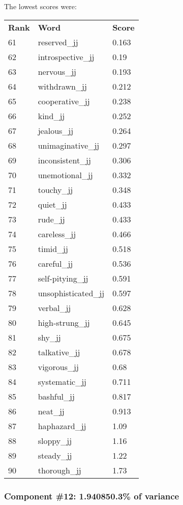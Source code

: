\documentclass[10pt,letterpaper]{book}
\begin{document}
The lowest scores were:
\begin{tabular}{ l l l }
        \textbf{Rank} & \textbf{Word} & \textbf{Score} \\
        61 & reserved\_jj & 0.163 \\
        62 & introspective\_jj & 0.19 \\
        63 & nervous\_jj & 0.193 \\
        64 & withdrawn\_jj & 0.212 \\
        65 & cooperative\_jj & 0.238 \\
        66 & kind\_jj & 0.252 \\
        67 & jealous\_jj & 0.264 \\
        68 & unimaginative\_jj & 0.297 \\
        69 & inconsistent\_jj & 0.306 \\
        70 & unemotional\_jj & 0.332 \\
        71 & touchy\_jj & 0.348 \\
        72 & quiet\_jj & 0.433 \\
        73 & rude\_jj & 0.433 \\
        74 & careless\_jj & 0.466 \\
        75 & timid\_jj & 0.518 \\
        76 & careful\_jj & 0.536 \\
        77 & self-pitying\_jj & 0.591 \\
        78 & unsophisticated\_jj & 0.597 \\
        79 & verbal\_jj & 0.628 \\
        80 & high-strung\_jj & 0.645 \\
        81 & shy\_jj & 0.675 \\
        82 & talkative\_jj & 0.678 \\
        83 & vigorous\_jj & 0.68 \\
        84 & systematic\_jj & 0.711 \\
        85 & bashful\_jj & 0.817 \\
        86 & neat\_jj & 0.913 \\
        87 & haphazard\_jj & 1.09 \\
        88 & sloppy\_jj & 1.16 \\
        89 & steady\_jj & 1.22 \\
        90 & thorough\_jj & 1.73 \\
\end{tabular}
\subsubsection{Component \#12: 1.940850.3\% of variance}
\end{document}
